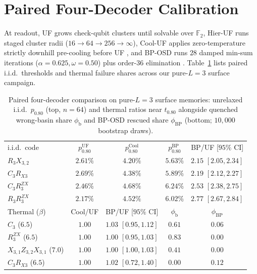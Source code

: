 \documentclass[aps,prx,reprint,superscriptaddress,nofootinbib,floatfix]{revtex4-2}
\begin{document}
\section{Paired Four-Decoder Calibration}
\label{app:decoders}

At readout, UF grows check-qubit clusters until solvable over $\mathbb{F}_2$, Hier-UF runs staged cluster radii ($16 \to 64 \to 256 \to \infty$), Cool-UF applies zero-temperature strictly downhill pre-cooling before UF \cite{kubica_sweep2019}, and BP-OSD runs $28$ damped min-sum iterations ($\alpha = 0.625, \omega = 0.50$) plus order-$36$ elimination \cite{panteleev_bposd, roffe_bposd2020}. Table~\ref{tab:decoders} lists paired i.i.d.\ thresholds and thermal failure shares across our pure-$L = 3$ surface campaign.

\begin{table}[!htbp]
\caption{Paired four-decoder comparison on pure-$L = 3$ surface memories: unrelaxed i.i.d.\ $p_{0.80}$ (top, $n = 64$) and thermal ratios near $t_{0.80}$ alongside quenched wrong-basin share $\phi_{\mathrm{b}}$ and BP-OSD rescued share $\phi_{\mathrm{BP}}$ (bottom; $10{,}000$ bootstrap draws).}
\label{tab:decoders}
{\scriptsize
\setlength{\tabcolsep}{0.6pt}
\begin{ruledtabular}
\begin{tabular}{lcccc}
i.i.d.\ code & $p_{0.80}^{\mathrm{UF}}$ & $p_{0.80}^{\mathrm{Cool}}$ & $p_{0.80}^{\mathrm{BP}}$ & BP/UF [$95\%$ CI] \\
\colrule
$R_3 X_{3,2}$ & $2.61\%$ & $4.20\%$ & $5.63\%$ & $2.15$ $[2.05, 2.34]$ \\
$C_3 R_{X3}$ & $2.69\%$ & $4.38\%$ & $5.89\%$ & $2.19$ $[2.12, 2.27]$ \\
$C_3 R_3^{ZX}$ & $2.46\%$ & $4.68\%$ & $6.24\%$ & $2.53$ $[2.38, 2.75]$ \\
$R_3 R_3^{ZX}$ & $2.17\%$ & $4.52\%$ & $6.02\%$ & $2.77$ $[2.67, 2.84]$ \\
\colrule
Thermal ($\beta$) & Cool/UF & BP/UF [$95\%$ CI] & $\phi_{\mathrm{b}}$ & $\phi_{\mathrm{BP}}$ \\
\colrule
$C_3$ ($6.5$) & $1.00$ & $1.03$ $[0.95, 1.12]$ & $0.61$ & $0.06$ \\
$R_3^{ZX}$ ($6.5$) & $1.00$ & $1.00$ $[0.95, 1.03]$ & $0.83$ & $0.00$ \\
$X_{3,1} Z_{3,2} X_{3,1}$ ($7.0$) & $1.00$ & $1.00$ $[1.00, 1.03]$ & $0.41$ & $0.00$ \\
$C_3 R_{X3}$ ($6.5$) & $1.00$ & $1.02$ $[0.72, 1.40]$ & $0.00$ & $0.12$ \\

\end{tabular}
\end{ruledtabular}}
\end{table}
\end{document}
